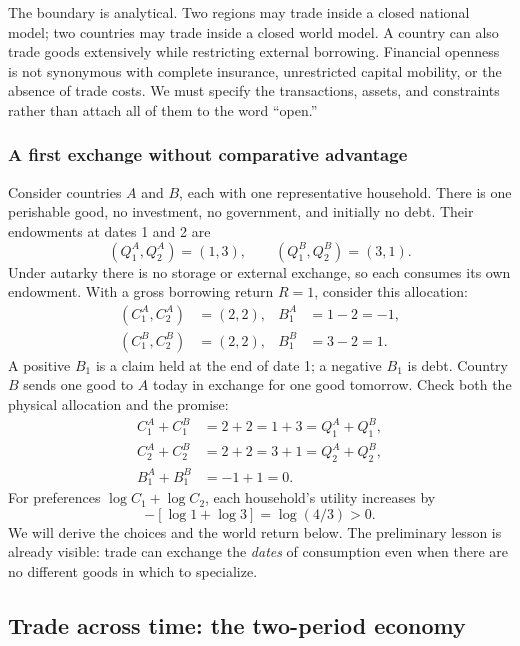 The boundary is analytical. Two regions may trade inside a closed national
model; two countries may trade inside a closed world model. A country can
also trade goods extensively while restricting external borrowing. Financial
openness is not synonymous with complete insurance, unrestricted capital
mobility, or the absence of trade costs. We must specify the transactions,
assets, and constraints rather than attach all of them to the word ``open.''

\subsubsection{A first exchange without comparative advantage}

Consider countries $A$ and $B$, each with one representative household. There
is one perishable good, no investment, no government, and initially no debt.
Their endowments at dates 1 and 2 are
\begin{equation}
 (Q_1^A,Q_2^A)=(1,3),\qquad (Q_1^B,Q_2^B)=(3,1).
\end{equation}
Under autarky there is no storage or external exchange, so each consumes its
own endowment. With a gross borrowing return $R=1$, consider this allocation:
\begin{align}
 (C_1^A,C_2^A)&=(2,2), & B_1^A&=1-2=-1,\\
 (C_1^B,C_2^B)&=(2,2), & B_1^B&=3-2=1.
\end{align}
A positive $B_1$ is a claim held at the end of date 1; a negative $B_1$ is debt.
Country $B$ sends one good to $A$ today in exchange for one good tomorrow.
Check both the physical allocation and the promise:
\begin{align}
 C_1^A+C_1^B&=2+2=1+3=Q_1^A+Q_1^B,\\
 C_2^A+C_2^B&=2+2=3+1=Q_2^A+Q_2^B,\\
 B_1^A+B_1^B&=-1+1=0.
\end{align}
For preferences $\log C_1+\log C_2$, each household's utility increases by
\begin{equation}
 [\log2+\log2]-[\log1+\log3]=\log(4/3)>0.
\end{equation}
We will derive the choices and the world return below. The preliminary lesson
is already visible: trade can exchange the \emph{dates} of consumption even
when there are no different goods in which to specialize.

\subsection{Trade across time: the two-period economy}

